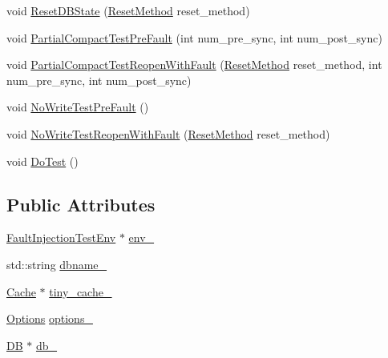 \begin{DoxyCompactItemize}
void \mbox{\hyperlink{classleveldb_1_1_fault_injection_test_a15c8b348e0d0569b2dbd5065386e7405}{Reset\+D\+B\+State}} (\mbox{\hyperlink{classleveldb_1_1_fault_injection_test_a316891ca042a42e0d26ec45450828cc3}{Reset\+Method}} reset\+\_\+method)
\item 
void \mbox{\hyperlink{classleveldb_1_1_fault_injection_test_a9a3c0876a2caae54ccbae754794f262c}{Partial\+Compact\+Test\+Pre\+Fault}} (int num\+\_\+pre\+\_\+sync, int num\+\_\+post\+\_\+sync)
\item 
void \mbox{\hyperlink{classleveldb_1_1_fault_injection_test_aba1c6ef251ae09ce32acb3a16e2c0004}{Partial\+Compact\+Test\+Reopen\+With\+Fault}} (\mbox{\hyperlink{classleveldb_1_1_fault_injection_test_a316891ca042a42e0d26ec45450828cc3}{Reset\+Method}} reset\+\_\+method, int num\+\_\+pre\+\_\+sync, int num\+\_\+post\+\_\+sync)
\item 
void \mbox{\hyperlink{classleveldb_1_1_fault_injection_test_a5989cfdb585f4f94364b111809161fad}{No\+Write\+Test\+Pre\+Fault}} ()
\item 
void \mbox{\hyperlink{classleveldb_1_1_fault_injection_test_a3b6eda3b745af3c89e4fe268431783ad}{No\+Write\+Test\+Reopen\+With\+Fault}} (\mbox{\hyperlink{classleveldb_1_1_fault_injection_test_a316891ca042a42e0d26ec45450828cc3}{Reset\+Method}} reset\+\_\+method)
\item 
void \mbox{\hyperlink{classleveldb_1_1_fault_injection_test_a451539e9d3eb1ba9e9f68cca5a774cdc}{Do\+Test}} ()
\end{DoxyCompactItemize}
\subsection*{Public Attributes}
\begin{DoxyCompactItemize}
\item 
\mbox{\hyperlink{classleveldb_1_1_fault_injection_test_env}{Fault\+Injection\+Test\+Env}} $\ast$ \mbox{\hyperlink{classleveldb_1_1_fault_injection_test_adb67cb8d9a917e46ec2a53ed5057edd5}{env\+\_\+}}
\item 
std\+::string \mbox{\hyperlink{classleveldb_1_1_fault_injection_test_a10e623017566062afd6015a3602232e4}{dbname\+\_\+}}
\item 
\mbox{\hyperlink{classleveldb_1_1_cache}{Cache}} $\ast$ \mbox{\hyperlink{classleveldb_1_1_fault_injection_test_a4fdcca3ee57d36a652276c1f30cf5452}{tiny\+\_\+cache\+\_\+}}
\item 
\mbox{\hyperlink{structleveldb_1_1_options}{Options}} \mbox{\hyperlink{classleveldb_1_1_fault_injection_test_a6d0711cdd4c9a601ab45dd0f781a6e62}{options\+\_\+}}
\item 
\mbox{\hyperlink{classleveldb_1_1_d_b}{DB}} $\ast$ \mbox{\hyperlink{classleveldb_1_1_fault_injection_test_aa34cf3e5150932bc948f7d2bc00c9c71}{db\+\_\+}}
\end{DoxyCompactItemize}


